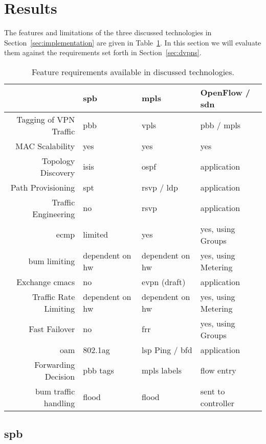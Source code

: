 \section{Results} %
\label{sec:results}

The features and limitations of the three discussed technologies in Section~\ref{sec:implementation} are given in Table~\ref{tb:reqs}. In this section we will evaluate them against the requirements set forth in Section~\ref{sec:dvpns}.

\begin{table}[h]
	\centering
	\begin{tabular}{r|lll}
	 & \acs{spb} & \acs{mpls} & OpenFlow / \acs{sdn}\\
	\hline
	Tagging of VPN Traffic & \acs{pbb} & \acs{vpls} & \acs{pbb} / \acs{mpls}\\
	MAC Scalability & yes & yes & yes\\
	Topology Discovery & \acs{isis} & \acs{ospf} & application\\
	Path Provisioning & \acs{spt} & \acs{rsvp} / \acs{ldp} & application\\
	Traffic Engineering & no & \acs{rsvp} & application\\
	\ac{ecmp} & limited & yes & yes, using Groups\\
	\ac{bum} limiting & dependent on \acs{hw} & dependent on \acs{hw} & yes, using Metering\\
	Exchange \acsp{cmac} & no & \ac{evpn} (draft) & application\\
	Traffic Rate Limiting & dependent on \acs{hw} & dependent on \acs{hw} & yes, using Metering\\
	Fast Failover & no & \acs{frr} & yes, using Groups\\
	\acs{oam} & 802.1ag & \acs{lsp} Ping / \acs{bfd} & application\\
	\hline
	Forwarding Decision & \acs{pbb} tags & \acs{mpls} labels & flow entry \\
	\ac{bum} traffic handling & flood & flood & sent to controller\\
	\end{tabular}
	\caption{Feature requirements available in discussed technologies.}
	\label{tb:reqs}
\end{table}


\subsection{\acs{spb}} %
\label{sub:spb}


